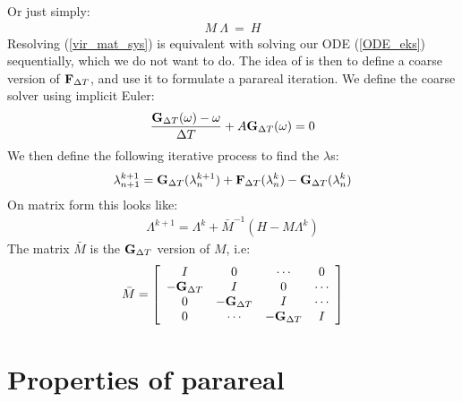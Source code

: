Or just simply:
\begin{align}
M \ \Lambda \ = \ H \label{vir_mat_sys}
\end{align}
Resolving (\ref{vir_mat_sys}) is equivalent with solving our ODE (\ref{ODE_eks}) sequentially, which we do not want to do. The idea of \cite{maday2002parareal} is then to define a coarse version of $\bold{F}_{\Delta T}$, and use it to formulate a parareal iteration. We define the coarse solver using implicit Euler:
 \begin{align}
\frac{\bold{G}_{\Delta T}(\omega) -\omega }{\Delta T } + A \bold{G}_{\Delta T}(\omega) = 0
\end{align}  
We then define the following iterative process to find the $\lambda$s:
\begin{align}
\lambda_{n+1}^{k+1} = \bold{G}_{\Delta T}(\lambda_{n}^{k+1}) + \bold{F}_{\Delta T}(\lambda_{n}^{k})-\bold{G}_{\Delta T}(\lambda_{n}^{k})
\end{align} 
On matrix form this looks like:
\begin{align}
\Lambda^{k+1} = \Lambda^k + \bar{M}^{-1}(H-M\Lambda^k) \label{matrix_iter1}
\end{align}
The matrix $\bar{M}$ is the $\bold{G}_{\Delta T}$ version of $M$, i.e:
\begin{align}
\bar{M} = \left[ \begin{array}{cccc}
   I & 0 & \cdots & 0 \\  
   -\bold{G}_{\Delta T} & I & 0 & \cdots \\ 
   0 &-\bold{G}_{\Delta T} & I  & \cdots \\
   0 &\cdots &-\bold{G}_{\Delta T} & I   \\
   \end{array}  \right]
\end{align}
\section{Properties of parareal}
